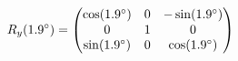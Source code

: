 \documentclass[preview]{standalone}
\begin{document}
\begin{align*}
\special{dvisvgm:raw <g id='unique000'>}R_y(1.9^\circ) = \begin{pmatrix} \cos(1.9^\circ) & 0 & -\sin(1.9^\circ) \\ 0 & 1 & 0 \\ \sin(1.9^\circ) & 0 & \cos(1.9^\circ) \end{pmatrix}\special{dvisvgm:raw </g>}
\end{align*}
\end{document}
